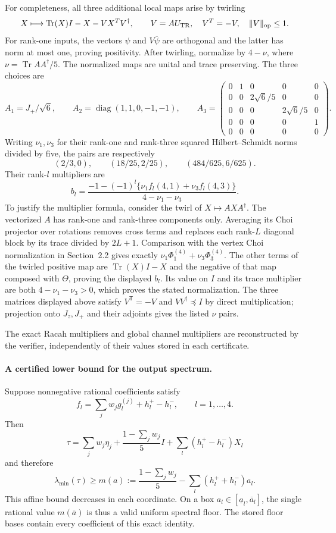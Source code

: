 \documentclass[11pt,a4paper]{article}
\begin{document}
For completeness, all three additional local maps arise by twirling
\[
 X\longmapsto\operatorname{Tr}(X)I-X-VX^TV^\dagger,
 \qquad V=A U_{\rm TR},\quad V^T=-V,\quad \|V\|_{\rm op}\le1.
\]
For rank-one inputs, the vectors $\psi$ and $V\overline\psi$ are
orthogonal and the latter has norm at most one, proving positivity.
After twirling, normalize by $4-\nu$, where
$\nu=\operatorname{Tr}AA^\dagger/5$. The normalized maps are unital and
trace preserving. The three choices are
\[
 A_1=J_+/\sqrt6,\qquad A_2=\operatorname{diag}(1,1,0,-1,-1),
 \qquad
 A_3=\begin{pmatrix}
 0&1&0&0&0\\0&0&2\sqrt6/5&0&0\\0&0&0&2\sqrt6/5&0\\
 0&0&0&0&1\\0&0&0&0&0
 \end{pmatrix}.
\]
Writing $\nu_1,\nu_3$ for their rank-one and rank-three squared
Hilbert--Schmidt norms divided by five, the pairs are respectively
\[
 (2/3,0),\qquad(18/25,2/25),\qquad(484/625,6/625).
\]
Their rank-$l$ multipliers are
\[
 b_l=\frac{-1-(-1)^l\{\nu_1 f_l(4,1)+\nu_3 f_l(4,3)\}}
 {4-\nu_1-\nu_3}.
\]
To justify the multiplier formula, consider the twirl of $X\mapsto AXA^\dagger$.
The vectorized $A$ has rank-one and rank-three components only. Averaging
its Choi projector over rotations removes cross terms and replaces each
rank-$L$ diagonal block by its trace divided by $2L+1$. Comparison with
the vertex Choi normalization in Section~2.2 gives exactly
$\nu_1\Phi_1^{(4)}+\nu_3\Phi_3^{(4)}$. The other terms of the twirled
positive map are $\operatorname{Tr}(X)I-X$ and the negative of that
map composed with $\Theta$, proving the displayed $b_l$. Its value on
$I$ and its trace multiplier are both $4-\nu_1-\nu_3>0$, which proves
the stated normalization. The three matrices displayed above satisfy
$V^{\mathsf T}=-V$ and $VV^\dagger\preceq I$ by direct multiplication;
projection onto $J_z,J_+$ and their adjoints gives the listed $\nu$ pairs.

The exact Racah multipliers and global channel multipliers are reconstructed
by the verifier, independently of their values stored in each certificate.

\paragraph{A certified lower bound for the output spectrum.}
Suppose nonnegative rational coefficients satisfy
\[
 f_l=\sum_jw_jg_l^{(j)}+h_l^+-h_l^-,\qquad l=1,\ldots,4.
\]
Then
\[
 \tau=\sum_jw_j\eta_j+
 \frac{1-\sum_jw_j}{5}I+
 \sum_l(h_l^+-h_l^-)X_l
\]
and therefore
\[
 \lambda_{\min}(\tau)\ge
 m(a):=\frac{1-\sum_jw_j}{5}-\sum_l(h_l^++h_l^-)a_l.
\]
This affine bound decreases in each coordinate. On a box
$a_l\in[\underline a_l,\overline a_l]$, the single rational value
$m(\overline a)$ is thus a valid uniform spectral floor.
The stored floor bases contain every coefficient of this exact identity.
\end{document}
